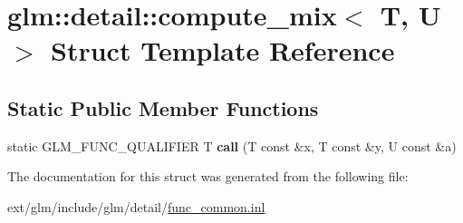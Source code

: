 \hypertarget{structglm_1_1detail_1_1compute__mix}{\section{glm\-:\-:detail\-:\-:compute\-\_\-mix$<$ T, U $>$ Struct Template Reference}
\label{structglm_1_1detail_1_1compute__mix}
}
\subsection*{Static Public Member Functions}
\begin{DoxyCompactItemize}
\item 
\hypertarget{structglm_1_1detail_1_1compute__mix_a13fd963d8385f36486509a48fd68da1c}{static G\-L\-M\-\_\-\-F\-U\-N\-C\-\_\-\-Q\-U\-A\-L\-I\-F\-I\-E\-R T {\bfseries call} (T const \&x, T const \&y, U const \&a)}\label{structglm_1_1detail_1_1compute__mix_a13fd963d8385f36486509a48fd68da1c}

\end{DoxyCompactItemize}


The documentation for this struct was generated from the following file\-:\begin{DoxyCompactItemize}
\item 
ext/glm/include/glm/detail/\hyperlink{func__common_8inl}{func\-\_\-common.\-inl}\end{DoxyCompactItemize}
